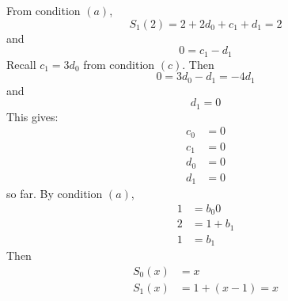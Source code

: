 \documentclass{article}
\begin{document}
\begin{answer}
        From condition $(a)$, 
            \begin{equation*}
                S_{1}(2) = 2 + 2d_{0} + c_{1} + d_{1} = 2
            \end{equation*}
        and
            \begin{equation*}
                0 = c_{1} - d_{1}
            \end{equation*}
        Recall $c_{1} = 3d_{0}$ from condition $(c)$. Then
            \begin{equation*}
                0 = 3d_{0} - d_{1} = -4d_{1}
            \end{equation*}
        and
            \begin{equation*}
                d_{1} = 0
            \end{equation*}
        This gives:
            \begin{align*}
                c_{0} &= 0             \\
                c_{1} &= 0  \\
                d_{0} &= 0 \\
                d_{1} &= 0  
            \end{align*}
        so far. By condition $(a)$, 
            \begin{align*}
                1            &= b_{0} 0                    \\
                2            &= 1 + b_{1} \\
                1 &= b_{1}                                     
            \end{align*}
        Then
            \begin{align*}
                S_{0}(x) &= x                                          \\
                S_{1}(x) &= 1 + (x - 1) = x
            \end{align*}
    \end{answer}
\end{document}
